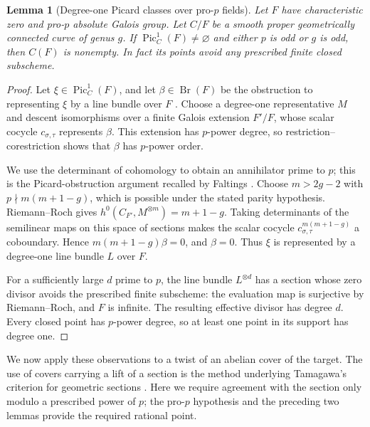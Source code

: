 \documentclass[11pt,a4paper]{article}
\numberwithin{equation}{section}
\theoremstyle{plain}
\newtheorem{lemma}[theorem]{Lemma}
\theoremstyle{definition}
\theoremstyle{remark}
\DeclareMathOperator{\Pic}{Pic}
\renewcommand{\S}{\ensuremath{\mathsection}}
\begin{document}
\begin{lemma}[Degree-one Picard classes over pro-$p$ fields]
\label{lem:picard-point}
Let $F$ have characteristic zero and pro-$p$ absolute Galois group. Let
$C/F$ be a smooth proper geometrically connected curve of genus $g$.
If $\Pic_C^1(F)\ne\varnothing$ and either $p$ is odd or $g$ is odd, then
$C(F)$ is nonempty. In fact its points avoid any prescribed finite closed
subscheme.
\end{lemma}
\begin{proof}
Let $\xi\in\Pic_C^1(F)$, and let $\beta\in\operatorname{Br}(F)$ be the
obstruction to representing $\xi$ by a line bundle over $F$
\cite[\S8.1, Proposition~4]{BLR1990}. Choose a
degree-one representative $M$ and descent isomorphisms over a finite Galois
extension $F'/F$, whose scalar cocycle $c_{\sigma,\tau}$ represents
$\beta$. This extension
has $p$-power degree, so restriction--corestriction shows that $\beta$ has
$p$-power order.

We use the determinant of cohomology to obtain an annihilator prime to
$p$; this is the Picard-obstruction argument recalled by Faltings
\cite[p.~143]{Faltings1998}.
Choose $m>2g-2$ with $p\nmid m(m+1-g)$, which is possible under the
stated parity hypothesis. Riemann--Roch gives
$h^0(C_{F'},M^{\otimes m})=m+1-g$. Taking determinants of the
semilinear maps on this space of sections makes the scalar cocycle
$c_{\sigma,\tau}^{m(m+1-g)}$ a coboundary. Hence
$m(m+1-g)\beta=0$, and $\beta=0$.
Thus $\xi$ is represented by a degree-one line bundle $L$ over $F$.

For a sufficiently large $d$ prime to $p$, the line bundle $L^{\otimes d}$
has a section whose zero divisor avoids the prescribed finite subscheme:
the evaluation map is surjective by Riemann--Roch, and $F$ is infinite.
The resulting effective divisor has degree $d$. Every closed point has
$p$-power degree, so at least one point in its support has degree one.
\end{proof}

We now apply these observations to a twist of an abelian cover of the
target. The use of covers carrying a lift of a section is the method
underlying Tamagawa's criterion for geometric sections
\cite[Corollary~2.10]{Tamagawa1997}. Here we require agreement with the
section only modulo a prescribed power of $p$; the pro-$p$ hypothesis
and the preceding two lemmas provide the required rational point.
\end{document}
